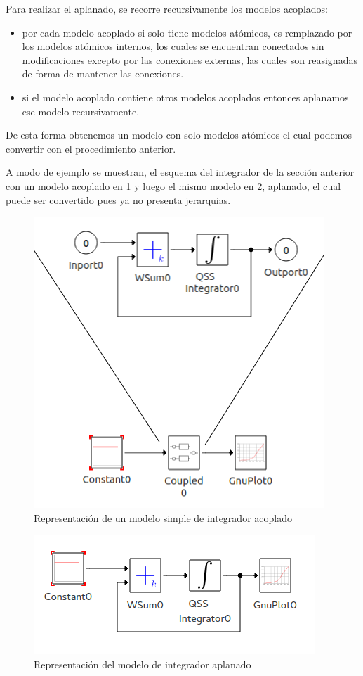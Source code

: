 Para realizar el aplanado, se recorre recursivamente los modelos acoplados:

\begin{itemize}
\item por cada modelo acoplado si solo tiene modelos atómicos, es remplazado por los modelos atómicos internos, los cuales se encuentran conectados sin modificaciones excepto por las conexiones externas, las cuales son reasignadas de forma de mantener las conexiones.
\item si el modelo acoplado contiene otros modelos acoplados entonces aplanamos ese modelo recursivamente.
\end{itemize} 

De esta forma obtenemos un modelo con solo modelos atómicos el cual podemos convertir con el procedimiento anterior.

A modo de ejemplo se muestran, el esquema del integrador de la sección anterior con un modelo acoplado en \ref{fig:acomplado} y luego el mismo modelo en \ref{fig:aplanado}, aplanado, el cual puede ser convertido pues ya no presenta jerarquias.

\begin{figure}[H]
\centering
 \includegraphics[width=0.5\linewidth]{integrator-sample}
 \caption{Representación de un modelo simple de integrador acoplado}
 \label{fig:acomplado}
\end{figure}


\begin{figure}[H]
\centering
 \includegraphics[width=0.5\linewidth]{integrator-expanded}
 \caption{Representación del modelo de integrador aplanado }
 \label{fig:aplanado}
\end{figure}



